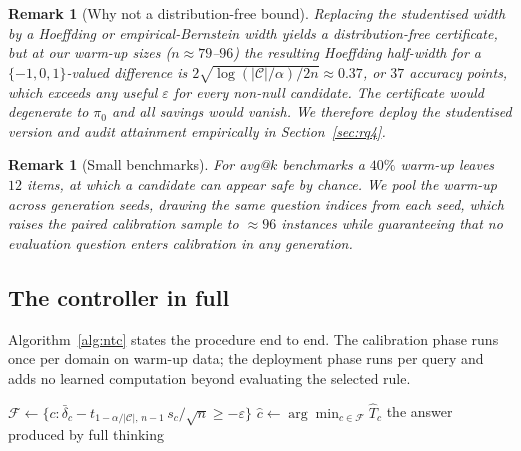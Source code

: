 \documentclass[acmsmall]{acmart}
\theoremstyle{acmdefinition}%
\newtheorem{remark}[theorem]{Remark}%
\theoremstyle{acmplain}}{}%
\begin{document}
\begin{remark}[Why not a distribution-free bound]\label{rem:df}
Replacing the studentised width by a Hoeffding or empirical-Bernstein width yields a distribution-free certificate, but at our warm-up sizes ($n \approx 79$--$96$) the resulting Hoeffding half-width for a $\{-1,0,1\}$-valued difference is $2\sqrt{\log(|\mathcal{C}|/\alpha)/2n} \approx 0.37$, or $37$ accuracy points, which exceeds any useful $\varepsilon$ for every non-null candidate. The certificate would degenerate to $\pi_0$ and all savings would vanish. We therefore deploy the studentised version and audit attainment empirically in Section~\ref{sec:rq4}.
\end{remark}

\begin{remark}[Small benchmarks]
For avg@$k$ benchmarks a $40\%$ warm-up leaves $12$ items, at which a candidate can appear safe by chance. We pool the warm-up across generation seeds, drawing \emph{the same question indices} from each seed, which raises the paired calibration sample to $\approx 96$ instances while guaranteeing that no evaluation question enters calibration in any generation.
\end{remark}

\subsection{The controller in full}
Algorithm~\ref{alg:ntc} states the procedure end to end. The calibration phase runs once per domain on warm-up data; the deployment phase runs per query and adds no learned computation beyond evaluating the selected rule.

\begin{algorithm}[t]
\small
\SetAlgoLined
{}
$\mathcal{F} \leftarrow \{c : \bar\delta_c - t_{1-\alpha/|\mathcal{C}|,\,n-1}\, s_c/\sqrt{n} \geq -\varepsilon\}$ 
$\hat c \leftarrow \arg\min_{c\in\mathcal{F}} \hat T_c$\;
\Return the answer produced by full thinking\;
\caption{NTC: risk-controlled nested budget control}
\label{alg:ntc}
\end{algorithm}
\end{document}

